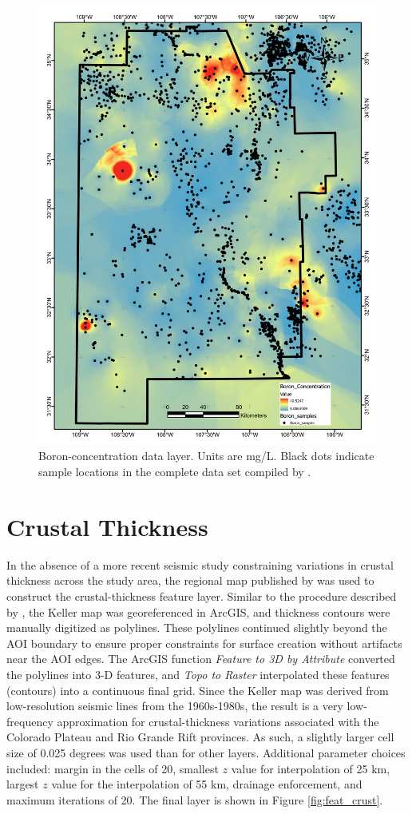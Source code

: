 \begin{figure}[H]
\centering
\includegraphics[width=0.75\linewidth]{templates/images/Figure-Boron.pdf}
\caption[Boron concentration data layer]{Boron-concentration data layer. Units are mg/L. Black dots indicate sample locations in the complete data set compiled by \protect\citet{bielicki_hydrogeolgic_2015}.}
\label{fig:feat_boron}
\end{figure}

\section{Crustal Thickness}\label{app:dl_crustal_thickness}

In the absence of a more recent seismic study constraining variations in crustal thickness across the study area, the regional map published by \citet{keller_comparative_1991} was used to construct the crustal-thickness feature layer. Similar to the procedure described by \citet{pepin_new_2019}, the Keller map was georeferenced in ArcGIS, and thickness contours were manually digitized as polylines. These polylines continued slightly beyond the AOI boundary to ensure proper constraints for surface creation without artifacts near the AOI edges. The ArcGIS function \textit{Feature to 3D by Attribute} converted the polylines into 3-D features, and \textit{Topo to Raster} interpolated these features (contours) into a continuous final grid. Since the Keller map was derived from low-resolution seismic lines from the 1960s-1980s, the result is a very low-frequency approximation for crustal-thickness variations associated with the Colorado Plateau and Rio Grande Rift provinces. As such, a slightly larger cell size of 0.025 degrees was used than for other layers. Additional parameter choices included: margin in the cells of 20, smallest $z$ value for interpolation of 25 km, largest $z$ value for the interpolation of 55 km, drainage enforcement, and maximum iterations of 20. The final layer is shown in Figure \ref{fig:feat_crust}.

